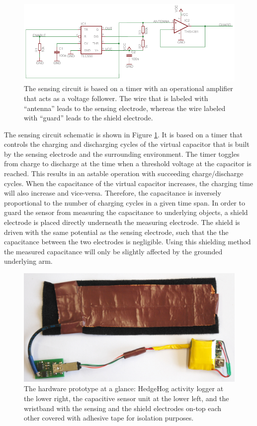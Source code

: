 \documentclass[runningheads,a4paper]{llncs}
\begin{document}
\begin{figure}
	\centering
		\includegraphics[width=1.00\textwidth]{Images/schematic.pdf}
	\caption{The sensing circuit is based on a timer with an operational amplifier that acts as a voltage follower. The wire that is labeled with ``antenna'' leads to the sensing electrode, whereas the wire labeled with ``guard'' leads to the shield electrode.}
	\label{fig:schematic}
\end{figure}

The sensing circuit schematic is shown in Figure \ref{fig:schematic}. It is based on a timer that controls the charging and discharging cycles of the virtual capacitor that is built by the sensing electrode and the surrounding environment. The timer toggles from charge to discharge at the time when a threshold voltage at the capacitor is reached. This results in an astable operation with succeeding charge/discharge cycles. When the capacitance of the virtual capacitor increases, the charging time will also increase and vice-versa. Therefore, the capacitance is inversely proportional to the number of charging cycles in a given time span. In order to guard the sensor from measuring the capacitance to underlying objects, a shield electrode is placed directly underneath the measuring electrode. The shield is driven with the same potential as the sensing electrode, such that the the capacitance between the two electrodes is negligible. Using this shielding method the measured capacitance will only be slightly 
affected by the grounded underlying arm.

\begin{figure}
	\centering
		\includegraphics[width=1.00\textwidth]{Images/capacitive_sensor_wristband_2.jpg}
	\caption{The hardware prototype at a glance: HedgeHog activity logger at the lower right, the capacitive sensor unit at the lower left, and the wristband with the sensing and the shield electrodes on-top each other covered with adhesive tape for isolation purposes.}
	\label{fig:cap_sensor}
\end{figure}
\end{document}
